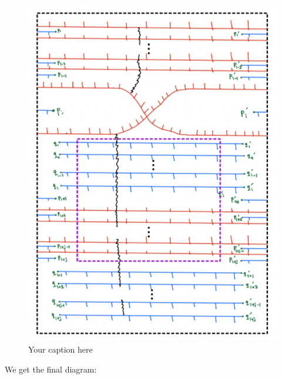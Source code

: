 \begin{figure}[H] %
    \centering
    \includegraphics[width=\linewidth]{diagrams/theorem12/15.png} %
    \caption{Your caption here}
    \label{fig:your-label}
\end{figure}

We get the final diagram:

